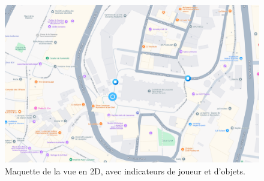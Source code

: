 \begin{figure}[H]
    \centering
    \includegraphics[width=1\linewidth]{assets/figures/Screenshots/Maps.png}
    \caption{Maquette de la vue en 2D, avec indicateurs de joueur et d'objets.}
    \label{fig:Maps}
\end{figure}




